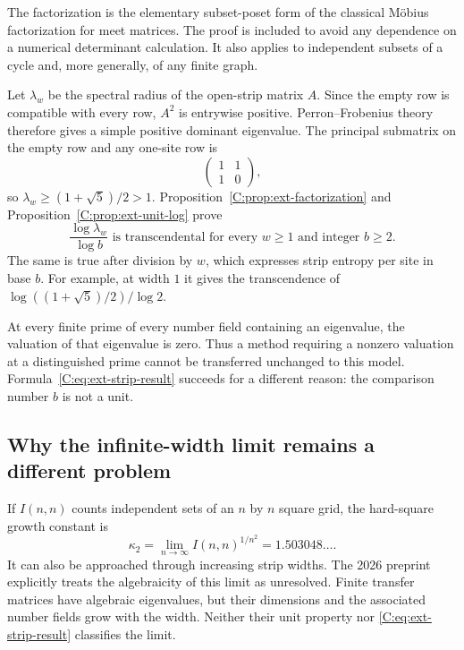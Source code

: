 \documentclass[11pt,a4paper]{article}
\theoremstyle{definition}
\theoremstyle{remark}
\numberwithin{equation}{section}
\begin{document}
The factorization is the elementary subset-poset form of the classical
M\"obius factorization for meet matrices.  The proof is included to avoid
any dependence on a numerical determinant calculation.  It also applies to
independent subsets of a cycle and, more generally, of any finite graph.

Let $\lambda_w$ be the spectral radius of the open-strip matrix $A$.
Since the empty row is compatible with every row, $A^2$ is entrywise
positive.  Perron--Frobenius theory therefore gives a simple positive
dominant eigenvalue.  The principal submatrix on the empty row and any
one-site row is
\[
 \begin{pmatrix}1&1\\1&0\end{pmatrix},
\]
so $\lambda_w\ge(1+\sqrt5)/2>1$.  Proposition~\ref{C:prop:ext-factorization}
and Proposition~\ref{C:prop:ext-unit-log} prove
\begin{equation}
 \boxed{\quad\frac{\log\lambda_w}{\log b}\text{ is transcendental
 for every }w\ge1\text{ and integer }b\ge2.\quad}
 \label{C:eq:ext-strip-result}
\end{equation}
The same is true after division by $w$, which expresses strip entropy per
site in base $b$.  For example, at width $1$ it gives the transcendence of
$\log((1+\sqrt5)/2)/\log2$.

At every finite prime of every number field containing an eigenvalue,
the valuation of that eigenvalue is zero.  Thus a method requiring a
nonzero valuation at a distinguished prime cannot be transferred unchanged
to this model.  Formula~\eqref{C:eq:ext-strip-result} succeeds for a different
reason: the comparison number $b$ is not a unit.

\subsection{Why the infinite-width limit remains a different problem}

If $I(n,n)$ counts independent sets of an $n$ by $n$ square grid, the
hard-square growth constant is
\[
 \kappa_2=\lim_{n\to\infty}I(n,n)^{1/n^2}
 =1.503048\ldots.
\]
It can also be approached through increasing strip widths.  The 2026
preprint \cite{R082} explicitly treats the algebraicity of this limit
as unresolved.  Finite transfer matrices have algebraic eigenvalues, but
their dimensions and the associated number fields grow with the width.
Neither their unit property nor \eqref{C:eq:ext-strip-result} classifies the
limit.
\end{document}
